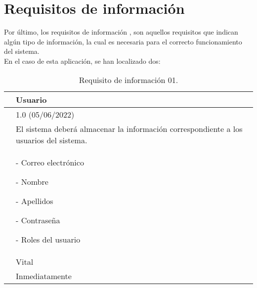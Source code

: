 \section{Requisitos de información}

Por último, los requisitos de información \cite{requisitos}, son aquellos requisitos que indican algún tipo de información, la cual es necesaria para el correcto funcionamiento del sistema.
\\

En el caso de esta aplicación, se han localizado dos:

\begin{table}[H]
\begin{center}
\begin{tabular}{|p{3cm}|p{10cm}|} \hline
\centering {\bf IRQ-01} & Usuario  \\ \hline\hline
\centering {\bf Versión} & 1.0 (05/06/2022) \\ \hline
\centering {\bf Descripción} & El sistema deberá almacenar la información correspondiente a los usuarios del sistema. \\ \hline
\centering {\bf Datos específicos} & 
- Correo electrónico

- Nombre

- Apellidos

- Contraseña

- Roles del usuario
\\ \hline
\centering {\bf Importancia} & Vital \\ \hline
\centering {\bf Urgencia} & Inmediatamente \\ \hline
\end{tabular}
\caption{Requisito de información 01.}
\label{enlaceIRQ1}
\end{center}
\end{table}

